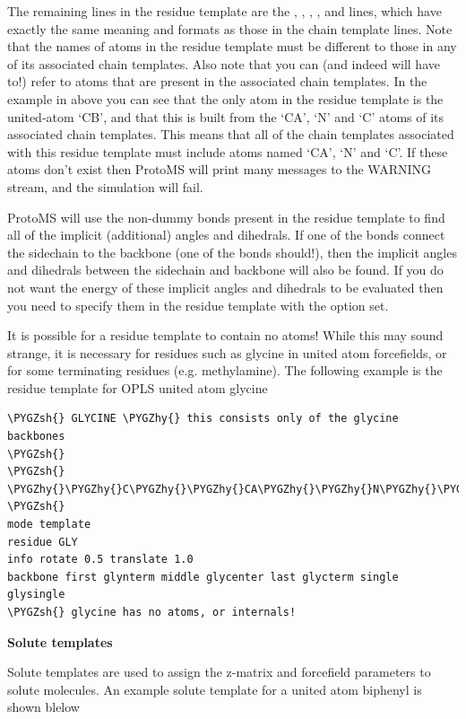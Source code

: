 \documentclass[letterpaper,10pt,english]{sphinxmanual}
\def\PYGZsh{\char`\#}
\def\PYGZhy{\char`\-}
\begin{document}
The remaining lines in the residue template are the , , , ,  and  lines, which have exactly the same meaning and formats as those in the chain template lines. Note that the names of atoms in the residue template must be different to those in any of its associated chain templates. Also note that you can (and indeed will have to!) refer to atoms that are present in the associated chain templates. In the example in above you can see that the only atom in the residue template is the united-atom ‘CB’, and that this is built from the ‘CA’, ‘N’ and ‘C’ atoms of its associated chain templates. This means that all of the chain templates associated with this residue template must include atoms named ‘CA’, ‘N’ and ‘C’. If these atoms don’t exist then ProtoMS will print many messages to the WARNING stream, and the simulation will fail.

ProtoMS will use the non-dummy bonds present in the residue template to find all of the implicit (additional) angles and dihedrals. If one of the bonds connect the sidechain to the backbone (one of the bonds should!), then the implicit angles and dihedrals between the sidechain and backbone will also be found. If you do not want the energy of these implicit angles and dihedrals to be evaluated then you need to specify them in the residue template with the  option set.

It is possible for a residue template to contain no atoms! While this may sound strange, it is necessary for residues such as glycine in united atom forcefields, or for some terminating residues (e.g. methylamine). The following example is the residue template for OPLS united atom glycine

\begin{Verbatim}[frame=single,commandchars=\\\{\}]
\PYGZsh{} GLYCINE \PYGZhy{} this consists only of the glycine backbones
\PYGZsh{}
\PYGZsh{}    \PYGZhy{}\PYGZhy{}C\PYGZhy{}\PYGZhy{}CA\PYGZhy{}\PYGZhy{}N\PYGZhy{}\PYGZhy{}
\PYGZsh{}
mode template
residue GLY
info rotate 0.5 translate 1.0
backbone first glynterm middle glycenter last glycterm single glysingle
\PYGZsh{} glycine has no atoms, or internals!
\end{Verbatim}

\textbf{Solute templates}

Solute templates are used to assign the z-matrix and forcefield parameters to solute molecules. An example solute template for a united atom biphenyl is shown blelow
\end{document}
